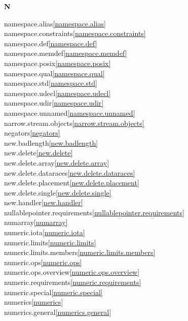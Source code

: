 \begin{multicols}{2}
\par \textbf{N}\par
namespace.alias\quad\ref{namespace.alias}\\
namespace.constraints\quad\ref{namespace.constraints}\\
namespace.def\quad\ref{namespace.def}\\
namespace.memdef\quad\ref{namespace.memdef}\\
namespace.posix\quad\ref{namespace.posix}\\
namespace.qual\quad\ref{namespace.qual}\\
namespace.std\quad\ref{namespace.std}\\
namespace.udecl\quad\ref{namespace.udecl}\\
namespace.udir\quad\ref{namespace.udir}\\
namespace.unnamed\quad\ref{namespace.unnamed}\\
narrow.stream.objects\quad\ref{narrow.stream.objects}\\
negators\quad\ref{negators}\\
new.badlength\quad\ref{new.badlength}\\
new.delete\quad\ref{new.delete}\\
new.delete.array\quad\ref{new.delete.array}\\
new.delete.dataraces\quad\ref{new.delete.dataraces}\\
new.delete.placement\quad\ref{new.delete.placement}\\
new.delete.single\quad\ref{new.delete.single}\\
new.handler\quad\ref{new.handler}\\
nullablepointer.requirements\quad\ref{nullablepointer.requirements}\\
numarray\quad\ref{numarray}\\
numeric.iota\quad\ref{numeric.iota}\\
numeric.limits\quad\ref{numeric.limits}\\
numeric.limits.members\quad\ref{numeric.limits.members}\\
numeric.ops\quad\ref{numeric.ops}\\
numeric.ops.overview\quad\ref{numeric.ops.overview}\\
numeric.requirements\quad\ref{numeric.requirements}\\
numeric.special\quad\ref{numeric.special}\\
numerics\quad\ref{numerics}\\
numerics.general\quad\ref{numerics.general}\\

\end{multicols}

